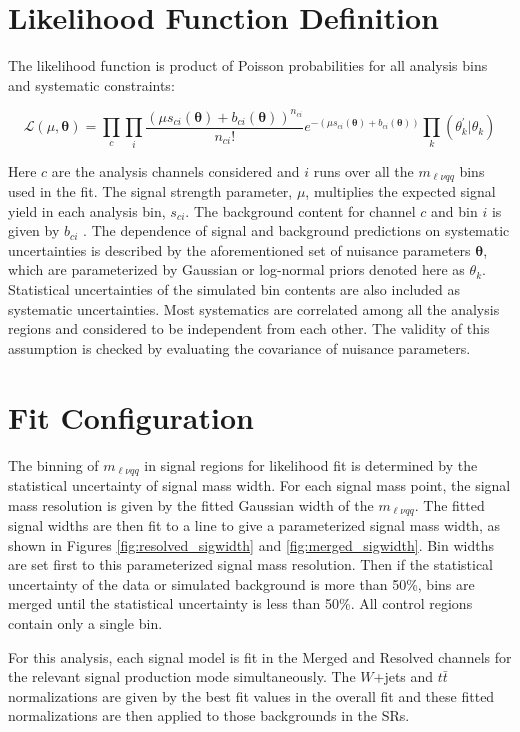 \section{Likelihood Function Definition}
The likelihood function is product of Poisson probabilities for all analysis bins and systematic constraints:

\begin{equation}
\mathcal{L}(\mu,\bm{\theta})= \prod_{c} \prod_{i} \frac{(\mu s_{ci}(\bm{\theta}) + b_{ci}(\bm{\theta}))^{n_{ci}}}{n_{ci}!} e^{-(\mu s_{ci}(\bm{\theta})+b_{ci}(\bm{\theta}))}\prod_{k}(\theta^{'}_{k}|\theta_{k})
\end{equation}

Here $c$ are the analysis channels considered and $i$ runs over all the $m_{\ell\nu qq}$ bins used in the fit. The signal strength parameter, $\mu$, multiplies the expected signal yield in each analysis bin, $s_{ci}$. The background content for channel $c$ and bin $i$ is given by $b_{ci}$ . The dependence of signal and background predictions on systematic uncertainties is described by the aforementioned set of nuisance parameters $\bm{\theta}$, which are parameterized by Gaussian or log-normal priors denoted here as $\theta_{k}$. Statistical uncertainties of the simulated bin contents are also included as systematic uncertainties. Most systematics are correlated among all the analysis regions and considered to be independent from each other. The validity of this assumption is checked by evaluating the covariance of nuisance parameters.  

\section{Fit Configuration}
The binning of $m_{\ell \nu qq}$ in signal regions for likelihood fit is determined by the statistical uncertainty of signal mass width. For each signal mass point, the signal mass resolution is given by the fitted Gaussian width of the $m_{\ell \nu qq}$. The fitted signal widths are then fit to a line to give a parameterized signal mass width, as shown in Figures \ref{fig:resolved_sigwidth} and \ref{fig:merged_sigwidth}. Bin widths are set first to this parameterized signal mass resolution. Then if the statistical uncertainty of the data or simulated background is more than 50\%, bins are merged until the statistical uncertainty is less than 50\%. All control regions contain only a single bin.

For this analysis, each signal model is fit in the Merged and Resolved channels for the relevant signal production mode simultaneously. The $W$+jets and $t\bar{t}$ normalizations are given by the best fit values in the overall fit and these fitted normalizations are then applied to those backgrounds in the SRs.

